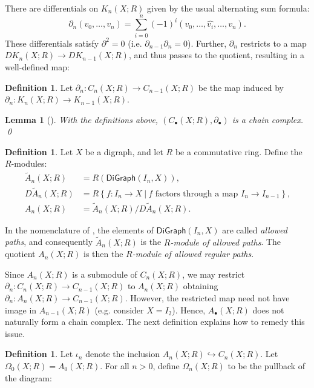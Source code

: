 \documentclass[11pt]{article}
\newtheorem{lemma}[theo]{Lemma}
\theoremstyle{definition}
\newtheorem{defi}[theo]{Definition}
\numberwithin{equation}{section}
\newcommand{\DiGraph}{\mathsf{DiGraph}}
\newcommand{\bd}{\partial}
\begin{document}
There are differentials on $K_n (X ; R)$ given by the usual alternating sum formula:
\[
    \bd_n(v_0, \ldots, v_n)=\sum_{i=0}^n (-1)^i(v_0, \ldots, \hat{v_{i}}, \ldots, v_n).
\]
These differentials satisfy $\bd^2 = 0$ (i.e. $\bd_{n-1} \bd_n = 0$).
Further, $\bd_n$ restricts to a map $DK_n (X ; R) \to DK_{n-1} (X ; R)$, and thus passes to the quotient, resulting in a well-defined map:

\begin{defi}
    Let $\bd_n \colon C_n (X ; R) \to C_{n-1} (X ; R)$ be the map induced by $\bd_n \colon K_n (X ; R) \to K_{n-1} (X ; R)$.
\end{defi}

\begin{lemma}[{\cite[Lemma 2.4]{grigor'yan-lin-muranov-yau:unpublished}}]
    With the definitions above, $(C_\bullet (X ; R), \bd_\bullet)$ is a chain complex. \qed
\end{lemma}

\begin{defi}\label{defn:A_n} 
Let $X$ be a digraph, and let $R$ be a commutative ring.
Define the $R$-modules:
\begin{align*}
    \widetilde{A}_n (X ; R) &= R(\DiGraph(I_n, X))\text{,} \\
    D\widetilde{A}_n (X ; R) &= R \left\{f \colon I_n \to X \ | \ f \text{ factors through a map } I_n \to I_{n-1}\right\}\text{,} \\
    A_n (X ; R) &= \widetilde{A}_n (X ; R) / D\widetilde{A}_n (X ; R)\text{.}
\end{align*}
\end{defi}

In the nomenclature of \cite{grigor'yan-lin-muranov-yau:unpublished}, the elements of $\DiGraph(I_n, X)$ are called \emph{allowed paths}, and consequently $\widetilde{A}_n (X ; R)$ is the \emph{$R$-module of allowed paths}.
The quotient $A_n (X ; R)$ is then the \emph{$R$-module of allowed regular paths}.

Since $A_n (X ; R)$ is a submodule of $C_n (X ; R)$, we may restrict $\bd_n \colon C_n (X ; R) \to C_{n-1} (X ; R)$ to $A_n (X ; R)$ obtaining $\bd_n \colon A_n (X ; R) \to C_{n-1} (X ; R)$.
However, the restricted map need not have image in $A_{n-1} (X; R)$ (e.g. consider $X = I_2$). Hence, $A_\bullet (X ; R)$ does not naturally form a chain complex.
The next definition explains how to remedy this issue.

\begin{defi} 
Let $\iota_n$ denote the inclusion $A_n (X; R) \hookrightarrow C_n (X; R)$.
Let $\Omega_0 (X; R) = A_0 (X; R)$. 
For all $n > 0$, define $\Omega_n (X; R)$ to be the pullback of the diagram:
\begin{center}
\end{center}
\end{defi}
\end{document}
